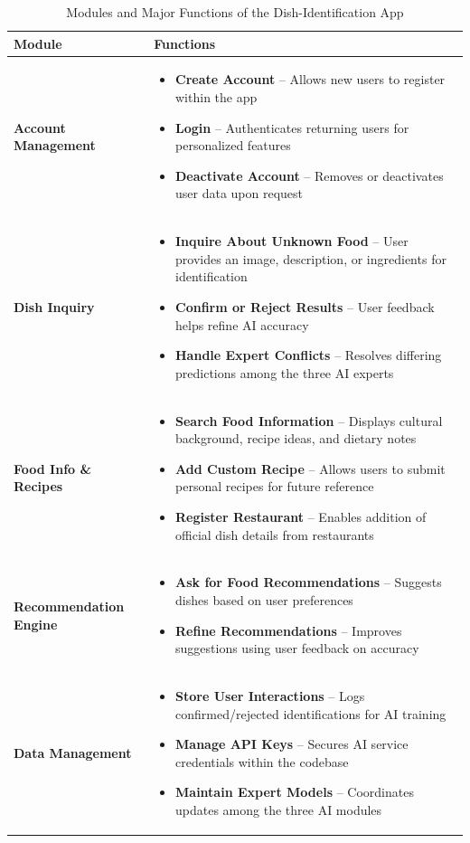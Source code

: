 \documentclass[]{article}
\begin{document}
\begin{table}[H]
\centering
\renewcommand{\arraystretch}{1.2} %
\begin{tabular}{|p{4cm}|p{10cm}|}
\hline
\textbf{Module} & \textbf{Functions} \\
\hline
\textbf{Account Management} &
\begin{itemize}
    \item \textbf{Create Account} – Allows new users to register within the app
    \item \textbf{Login} – Authenticates returning users for personalized features
    \item \textbf{Deactivate Account} – Removes or deactivates user data upon request
\end{itemize} \\
\hline
\textbf{Dish Inquiry} &
\begin{itemize}
    \item \textbf{Inquire About Unknown Food} – User provides an image, description, or ingredients for identification
    \item \textbf{Confirm or Reject Results} – User feedback helps refine AI accuracy
    \item \textbf{Handle Expert Conflicts} – Resolves differing predictions among the three AI experts
\end{itemize} \\
\hline
\textbf{Food Info \& Recipes} &
\begin{itemize}
    \item \textbf{Search Food Information} – Displays cultural background, recipe ideas, and dietary notes
    \item \textbf{Add Custom Recipe} – Allows users to submit personal recipes for future reference
    \item \textbf{Register Restaurant} – Enables addition of official dish details from restaurants
\end{itemize} \\
\hline
\textbf{Recommendation Engine} &
\begin{itemize}
    \item \textbf{Ask for Food Recommendations} – Suggests dishes based on user preferences
    \item \textbf{Refine Recommendations} – Improves suggestions using user feedback on accuracy
\end{itemize} \\
\hline
\textbf{Data Management} &
\begin{itemize}
    \item \textbf{Store User Interactions} – Logs confirmed/rejected identifications for AI training
    \item \textbf{Manage API Keys} – Secures AI service credentials within the codebase
    \item \textbf{Maintain Expert Models} – Coordinates updates among the three AI modules
\end{itemize} \\
\hline
\end{tabular}
\caption{Modules and Major Functions of the Dish-Identification App}
\label{tab:dish-functions}
\end{table}
\end{document}
